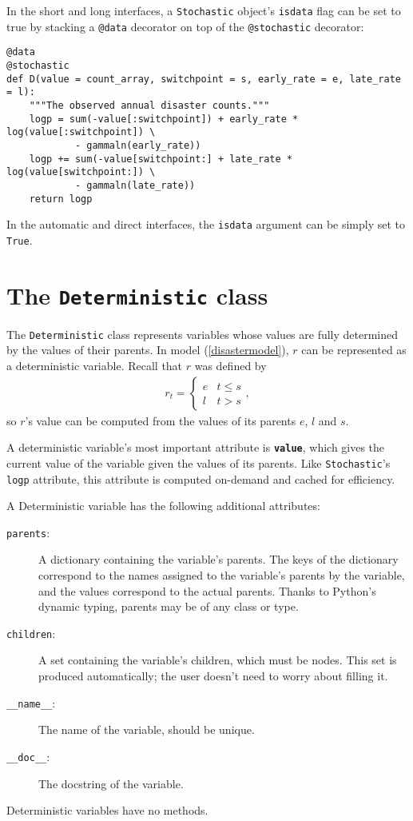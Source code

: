 In the short and long interfaces, a \texttt{Stochastic} object's \texttt{isdata} flag can be set to true by stacking a \texttt{@data} decorator on top of the \texttt{@stochastic} decorator:
\begin{verbatim}
@data
@stochastic
def D(value = count_array, switchpoint = s, early_rate = e, late_rate = l):
    """The observed annual disaster counts."""
    logp = sum(-value[:switchpoint]) + early_rate * log(value[:switchpoint]) \
            - gammaln(early_rate))
    logp += sum(-value[switchpoint:] + late_rate * log(value[switchpoint:]) \
            - gammaln(late_rate))
    return logp
\end{verbatim}
In the automatic and direct interfaces, the \texttt{isdata} argument can be simply set to \texttt{True}.


\section{The \texttt{Deterministic} class}\label{deterministic}

The \texttt{Deterministic} class represents variables whose values are fully determined by the values of their parents. In model (\ref{disastermodel}), $r$ can be represented as a deterministic variable. Recall that $r$ was defined by
\begin{eqnarray*}
    r_t=\left\{\begin{array}{ll}
        e & t\le s\\ l & t>s
        \end{array}\right.,
\end{eqnarray*}
so $r$'s value can be computed from the values of its parents $e$, $l$ and $s$.

A deterministic variable's most important attribute is \texttt{\bfseries value}, which gives the current value of the variable given the values of its parents. Like \texttt{Stochastic}'s \texttt{logp} attribute, this attribute is computed on-demand and cached for efficiency.

A Deterministic variable has the following additional attributes:
\begin{description}
    \item[\texttt{parents}:] A dictionary containing the variable's parents. The keys of the dictionary correspond to the names assigned to the variable's parents by the variable, and the values correspond to the actual parents. Thanks to Python's dynamic typing, parents may be of any class or type.
    \item[\texttt{children}:] A set containing the variable's children, which must be nodes. This set is produced automatically; the user doesn't need to worry about filling it.
    \item[\texttt{__name__}:] The name of the variable, should be unique.
    \item[\texttt{__doc__}:] The docstring of the variable.
\end{description}
Deterministic variables have no methods.


